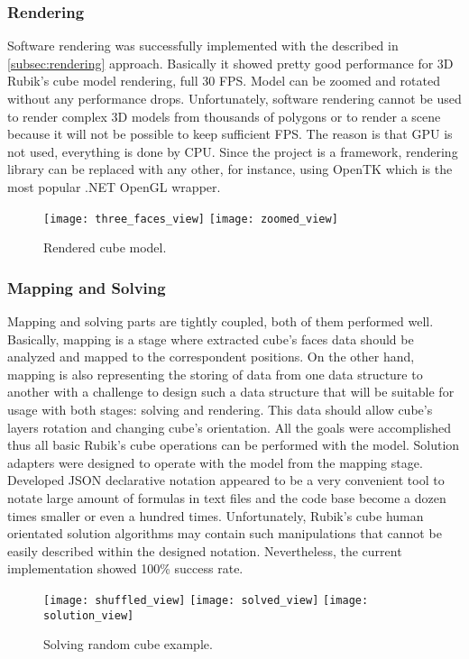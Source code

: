\documentclass[../../main.tex]{subfiles}
\begin{document}
\subsubsection*{Rendering}

Software rendering was successfully implemented with the described in \ref{subsec:rendering} approach. Basically it showed pretty good performance for 3D Rubik's cube model rendering, full 30 \ac{FPS}. Model can be zoomed and rotated without any performance drops. Unfortunately, software rendering cannot be used to render complex 3D models from thousands of polygons or to render a scene because it will not be possible to keep sufficient FPS. The reason is that \ac{GPU} is not used, everything is done by \ac{CPU}. Since the project is a framework, rendering library can be replaced with any other, for instance, using \ac{OpenTK} which is the most popular .NET \ac{OpenGL} wrapper. 

\begin{figure} [ht!]
    \begin{center}
        \texttt{[image: three\_faces\_view]}
        \texttt{[image: zoomed\_view]}
        \caption{Rendered cube model.}
        \label{fig:rendered_cube_view}
    \end{center}
\end{figure}

\subsubsection*{Mapping and Solving}

Mapping and solving parts are tightly coupled, both of them performed well. Basically, mapping is a stage where extracted cube's faces data should be analyzed and mapped to the correspondent positions. On the other hand, mapping is also representing the storing of data from one data structure to another with a challenge to design such a data structure that will be suitable for usage with both stages: solving and rendering. This data should allow cube's layers rotation and changing cube's orientation. All the goals were accomplished thus all basic Rubik's cube operations can be performed with the model.
Solution adapters were designed to operate with the model from the mapping stage. Developed \ac{JSON} declarative notation appeared to be a very convenient tool to notate large amount of formulas in text files and the code base become a dozen times smaller or even a hundred times. Unfortunately, Rubik's cube human orientated solution algorithms may contain such manipulations that cannot be easily described within the designed notation. Nevertheless, the current implementation showed 100\% success rate.

\begin{figure} [ht!]
    \begin{center}
        \texttt{[image: shuffled\_view]}
        \texttt{[image: solved\_view]}
         \texttt{[image: solution\_view]}
        \caption{Solving random cube example.}
        \label{fig:solving_cube_view}
    \end{center}
\end{figure}
\end{document}
